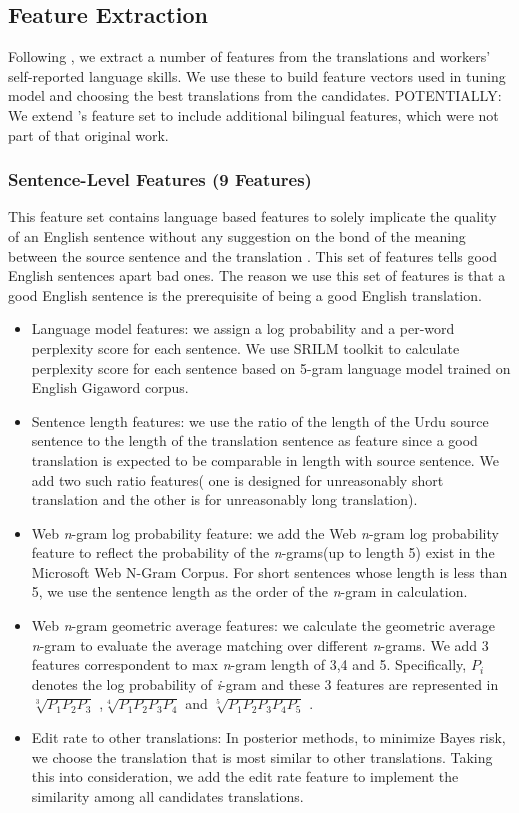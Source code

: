 \documentclass[11pt]{article}
\begin{document}
\subsection{Feature Extraction}

Following , we extract a number of features from the translations and workers' self-reported language skills.  We use these to build feature vectors used in tuning model and choosing the best translations from the candidates. 
POTENTIALLY: We extend 's feature set to include additional bilingual features, which were not part of that original work.
\subsubsection*{Sentence-Level Features (9 Features)}
This feature set contains language based features to solely implicate the quality of an English sentence without any suggestion on the bond of the meaning between the source sentence and the translation . This set of features tells good English sentences apart bad ones. The reason we use this set of features is that a good English sentence is the prerequisite of being a good English translation.
\begin{itemize}
\item Language model features:	we assign a log probability and a per-word perplexity score for each sentence. We use SRILM toolkit to calculate perplexity score for each sentence based on 5-gram language model trained on English Gigaword corpus.
\item Sentence length features:	we use the ratio of the length of the Urdu source sentence to the length of  the translation sentence as feature since a good translation is expected to be comparable in length with source sentence. We add two such ratio features( one is designed for unreasonably short translation and the other is for unreasonably long translation).
\item Web \textit{n}-gram log probability feature: we add the Web \textit{n}-gram log probability feature to reflect  the probability of the \textit{n}-grams(up to length 5) exist in the Microsoft Web N-Gram Corpus. For short sentences whose length is less than 5, we use the sentence length as the order of the \textit{n}-gram in calculation.
\item Web \textit{n}-gram geometric average features: we calculate the geometric average \textit{n}-gram  to evaluate the average matching over different \textit{n}-grams. We add 3 features correspondent to max \textit{n}-gram length of 3,4 and 5. Specifically, $P_i$ denotes the log probability of \textit{i}-gram and these 3 features are represented in $\sqrt[3]{P_1 P_2 P_3}$ ,$\sqrt[4]{P_1 P_2 P_3 P_4}$ and $\sqrt[5]{P_1 P_2 P_3 P_4 P_5}$ .
\item Edit rate to other translations: In posterior methods, to minimize Bayes risk, we choose the translation  that is most similar to other translations. Taking this into consideration, we add the edit rate feature to implement the similarity among all candidates translations.
\end{itemize}
\end{document}
